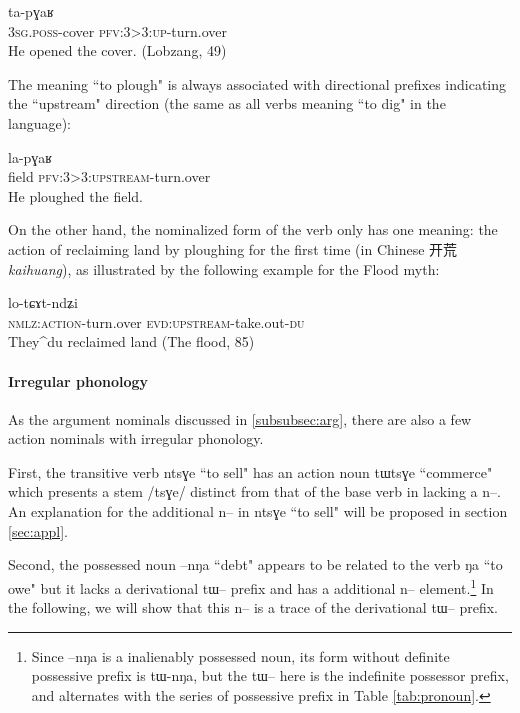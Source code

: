 \documentclass[oldfontcommands,oneside,a4paper,11pt]{article}
\newcommand{\ipa}[1]{{\phon \mbox{#1}}} %
\newcommand{\zh}[1]{{\cn #1}}
\begin{document}
   \begin{exe} \label{ex:tapGaR}
\ex
\gll   \ipa{ɯ-fkaβ} \ipa{ta-pɣaʁ} \\
 \textsc{3sg.poss}-cover \textsc{pfv:3>3:up}-turn.over \\
 \glt  He opened the cover. (Lobzang, 49)
\end{exe} 


The meaning ``to plough" is always associated with directional prefixes indicating the ``upstream" direction (the same as all verbs meaning ``to dig" in the language):
   \begin{exe} \label{ex:lapGaR}
\ex
\gll   \ipa{tɯji} \ipa{la-pɣaʁ} \\
field \textsc{pfv:3>3:upstream}-turn.over \\
 \glt  He ploughed the field.
\end{exe} 

On the other hand, the nominalized form of the verb only has one meaning: the action of reclaiming land by ploughing for the first time (in Chinese \zh{开荒} \textit{kaihuang}), as illustrated by the following example for the Flood myth:

\begin{exe} \label{ex:tWpGaR}
\ex
\gll   \ipa{tɯ-pɣaʁ} \ipa{lo-tɕɤt-ndʑi} \\
\textsc{nmlz:action}-turn.over \textsc{evd:upstream}-take.out-\textsc{du} \\
 \glt  They^{du} reclaimed land (The flood, 85)
\end{exe}

\paragraph{Irregular phonology}
As the argument nominals discussed in \ref{subsubsec:arg}, there are also a few action nominals with irregular phonology. 

First, the transitive verb \ipa{ntsɣe} ``to sell" has an  action noun \ipa{tɯtsɣe} ``commerce"  which presents a stem /\ipa{tsɣe}/ distinct from that of the base verb in lacking a \ipa{n--}. An explanation for the additional \ipa{n}-- in  \ipa{ntsɣe} ``to sell" will be proposed in section \ref{sec:appl}.

Second,  the possessed noun \ipa{--nŋa} ``debt" appears to be related to the verb \ipa{ŋa} ``to owe" but it lacks a derivational \ipa{tɯ}-- prefix and has a additional \ipa{n}-- element.\footnote{Since \ipa{--nŋa} is a inalienably possessed noun, its form without definite possessive prefix is \ipa{tɯ-nŋa}, but the \ipa{tɯ--} here is the indefinite possessor prefix, and alternates with the series of possessive prefix in Table \ref{tab:pronoun}. } In the following, we will show that this \ipa{n--} is a trace of the derivational \ipa{tɯ}-- prefix.
\end{document}
